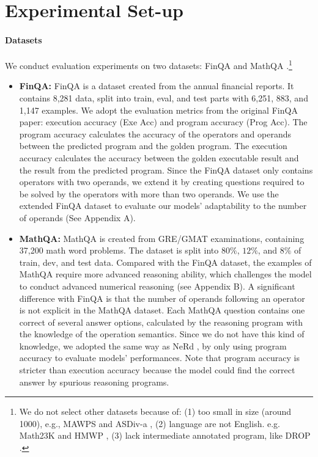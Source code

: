 \documentclass{article}
\begin{document}
\section{Experimental Set-up}



\paragraph{Datasets}
\label{section: datasets}
We conduct evaluation experiments on two datasets: FinQA \cite{finqa} and MathQA \cite{MathQA}.\footnote{We do not select other datasets because of: (1) too small in size (around 1000), e.g., MAWPS \cite{MAWPS} and ASDiv-a \cite{ref_18}, (2) language are not English. e.g. Math23K \cite{ref_22} and HMWP \cite{ref_13}, (3) lack intermediate annotated program, like DROP \cite{ref_19}.}

\begin{itemize}[leftmargin=*]
\item[] {\bf FinQA:} FinQA is a dataset created from the annual financial reports. It contains 8,281 data, split into train, eval, and test parts with 6,251, 883, and 1,147 examples. We adopt the evaluation metrics from the original FinQA paper: execution accuracy (Exe Acc) and program accuracy (Prog Acc). The program accuracy calculates the accuracy of the operators and operands between the predicted program and the golden program. The execution accuracy calculates the accuracy between the golden executable result and the result from the predicted program. Since the FinQA dataset only contains operators with two operands, we extend it by creating questions required to be solved by the operators with more than two operands. We use the extended FinQA dataset to evaluate our models' adaptability to the number of operands (See Appendix A).
    
\item[] {\bf MathQA:} MathQA is created from GRE/GMAT examinations, containing 37,200 math word problems. The dataset is split into \(80\%\), \(12\%\), and \(8\%\) of train, dev, and test data. Compared with the FinQA dataset, the examples of MathQA require more advanced reasoning ability, which challenges the model to conduct advanced numerical reasoning (see Appendix B). A significant difference with FinQA is that the number of operands following an operator is not explicit in the MathQA dataset. Each MathQA question contains one correct of several answer options, calculated by the reasoning program with the knowledge of the operation semantics. Since we do not have this kind of knowledge, we adopted the same way as NeRd \cite{NeRd}, by only using program accuracy to evaluate models' performances. Note that program accuracy is stricter than execution accuracy because the model could find the correct answer by spurious reasoning programs.
\end{itemize}
\end{document}
